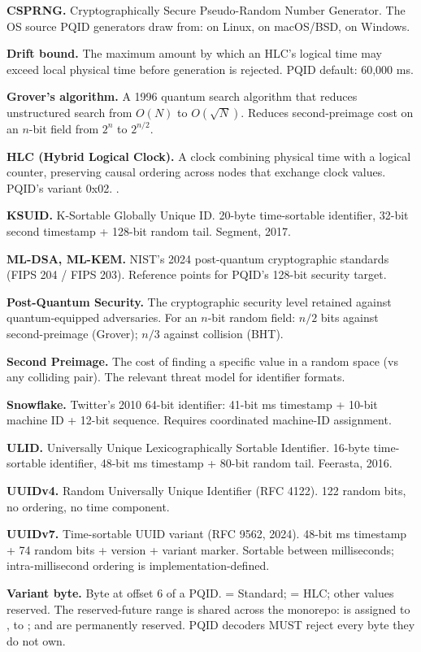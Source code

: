 \textbf{CSPRNG.} Cryptographically Secure Pseudo-Random Number Generator. The OS source PQID generators draw from:  on Linux,  on macOS/BSD,  on Windows.

\textbf{Drift bound.} The maximum amount by which an HLC's logical time may exceed local physical time before generation is rejected. PQID default: 60{,}000 ms.

\textbf{Grover's algorithm.} A 1996 quantum search algorithm that reduces unstructured search from $O(N)$ to $O(\sqrt{N})$. Reduces second-preimage cost on an $n$-bit field from $2^n$ to $2^{n/2}$.

\textbf{HLC (Hybrid Logical Clock).} A clock combining physical time with a logical counter, preserving causal ordering across nodes that exchange clock values. PQID's variant 0x02. \citet{kulkarni2014hlc}.

\textbf{KSUID.} K-Sortable Globally Unique ID. 20-byte time-sortable identifier, 32-bit second timestamp + 128-bit random tail. Segment, 2017.

\textbf{ML-DSA, ML-KEM.} NIST's 2024 post-quantum cryptographic standards (FIPS 204 / FIPS 203). Reference points for PQID's 128-bit security target.

\textbf{Post-Quantum Security.} The cryptographic security level retained against quantum-equipped adversaries. For an $n$-bit random field: $n/2$ bits against second-preimage (Grover); $n/3$ against collision (BHT).

\textbf{Second Preimage.} The cost of finding a specific value in a random space (vs any colliding pair). The relevant threat model for identifier formats.

\textbf{Snowflake.} Twitter's 2010 64-bit identifier: 41-bit ms timestamp + 10-bit machine ID + 12-bit sequence. Requires coordinated machine-ID assignment.

\textbf{ULID.} Universally Unique Lexicographically Sortable Identifier. 16-byte time-sortable identifier, 48-bit ms timestamp + 80-bit random tail. Feerasta, 2016.

\textbf{UUIDv4.} Random Universally Unique Identifier (RFC 4122). 122 random bits, no ordering, no time component.

\textbf{UUIDv7.} Time-sortable UUID variant (RFC 9562, 2024). 48-bit ms timestamp + 74 random bits + version + variant marker. Sortable between milliseconds; intra-millisecond ordering is implementation-defined.

\textbf{Variant byte.} Byte at offset 6 of a PQID.  = Standard;  = HLC; other values reserved. The reserved-future range is shared across the \pqtoolkit{} monorepo:  is assigned to \pqhash{},  to \pqcrypt{};  and  are permanently reserved. PQID decoders MUST reject every byte they do not own.

